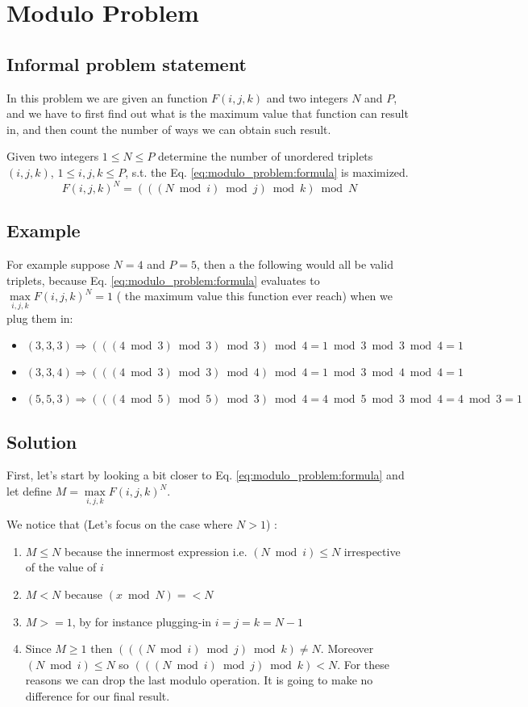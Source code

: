 \chapter{Modulo Problem}
\section{Informal problem statement}
In this problem we are given an function $F(i,j,k)$ and two integers $N$ and $P$, and we have to first find out what is the maximum value that function can result in, and then count the number of ways we can obtain such result.

Given two integers $1 \leq N \leq P $ determine the number of unordered triplets $(i,j,k)$, $1 \leq i,j,k \leq P$, s.t. the Eq. \ref{eq:modulo_problem:formula} is maximized.
\begin{equation}
	\label{eq:modulo_problem:formula}
	F(i,j,k)^N = ( ( (N \bmod{i}) \bmod{j} ) \bmod{k}) \bmod{N}
\end{equation}

\section{Example}
For example suppose $N = 4$ and $P = 5$, then a the following would all be valid triplets, because Eq. \ref{eq:modulo_problem:formula} evaluates to $\max\limits_{i,j,k}F(i,j,k)^N=1$ ( the maximum value this function ever reach) when we plug them in:
\begin{itemize}
	\item $(3,3,3) \Rightarrow ( ( (4 \bmod{3}) \bmod{3} ) \bmod{3}) \bmod{4} = 1 \bmod{3} \bmod{3} \bmod{4} = 1$
	\item $(3,3,4) \Rightarrow ( ( (4 \bmod{3}) \bmod{3} ) \bmod{4}) \bmod{4} = 1 \bmod{3} \bmod{4} \bmod{4} = 1$
	\item $(5,5,3) \Rightarrow ( ( (4 \bmod{5}) \bmod{5} ) \bmod{3}) \bmod{4} = 4 \bmod{5} \bmod{3} \bmod{4} = 4 \bmod{3} =1$
\end{itemize}

\section{Solution}
First, let's start by looking a bit closer to Eq. \ref{eq:modulo_problem:formula} and let define $M = \max\limits_{i,j,k}F(i,j,k)^N$.

We notice that (Let's focus on the case where $N > 1$) :

\begin{enumerate}
	\item $M \leq N$ because the innermost expression i.e. $(N \bmod i) \leq N$ irrespective of the value of $i$
	\item $M < N$ because $(x \bmod N)= < N$
	\item $M >=1$, by for instance plugging-in $i=j=k=N-1$
	\item Since $M \ge 1$ then  $( ( (N \bmod{i}) \bmod{j} ) \bmod{k}) \neq N$. Moreover $(N \bmod i) \leq N$ so $( ( (N \bmod{i}) \bmod{j} ) \bmod{k}) < N$. For these reasons we can drop the last modulo operation. It is going to make no difference for our final result.
\end{enumerate}

